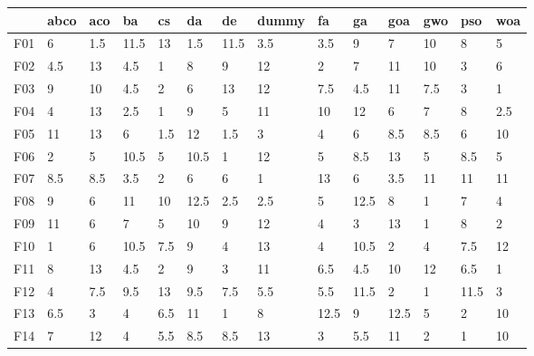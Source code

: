 \begin{table}
    \centering
    \begin{adjustbox}{width=\linewidth}
        \begin{tabular}{llllllllllllll}
            \toprule
            {}   & abco  & aco   & ba    & cs    & da    & de    & dummy & fa    & ga    & goa   & gwo   & pso   & woa   \\
            \midrule
            F01  & 6     & 1.5   & 11.5  & 13    & 1.5   & 11.5  & 3.5   & 3.5   & 9     & 7     & 10    & 8     & 5     \\
            F02  & 4.5   & 13    & 4.5   & 1     & 8     & 9     & 12    & 2     & 7     & 11    & 10    & 3     & 6     \\
            F03  & 9     & 10    & 4.5   & 2     & 6     & 13    & 12    & 7.5   & 4.5   & 11    & 7.5   & 3     & 1     \\
            F04  & 4     & 13    & 2.5   & 1     & 9     & 5     & 11    & 10    & 12    & 6     & 7     & 8     & 2.5   \\
            F05  & 11    & 13    & 6     & 1.5   & 12    & 1.5   & 3     & 4     & 6     & 8.5   & 8.5   & 6     & 10    \\
            F06  & 2     & 5     & 10.5  & 5     & 10.5  & 1     & 12    & 5     & 8.5   & 13    & 5     & 8.5   & 5     \\
            F07  & 8.5   & 8.5   & 3.5   & 2     & 6     & 6     & 1     & 13    & 6     & 3.5   & 11    & 11    & 11    \\
            F08  & 9     & 6     & 11    & 10    & 12.5  & 2.5   & 2.5   & 5     & 12.5  & 8     & 1     & 7     & 4     \\
            F09  & 11    & 6     & 7     & 5     & 10    & 9     & 12    & 4     & 3     & 13    & 1     & 8     & 2     \\
            F10  & 1     & 6     & 10.5  & 7.5   & 9     & 4     & 13    & 4     & 10.5  & 2     & 4     & 7.5   & 12    \\
            F11  & 8     & 13    & 4.5   & 2     & 9     & 3     & 11    & 6.5   & 4.5   & 10    & 12    & 6.5   & 1     \\
            F12  & 4     & 7.5   & 9.5   & 13    & 9.5   & 7.5   & 5.5   & 5.5   & 11.5  & 2     & 1     & 11.5  & 3     \\
            F13  & 6.5   & 3     & 4     & 6.5   & 11    & 1     & 8     & 12.5  & 9     & 12.5  & 5     & 2     & 10    \\
            F14  & 7     & 12    & 4     & 5.5   & 8.5   & 8.5   & 13    & 3     & 5.5   & 11    & 2     & 1     & 10    \\

\end{tabular}
\end{adjustbox}
\end{table}
